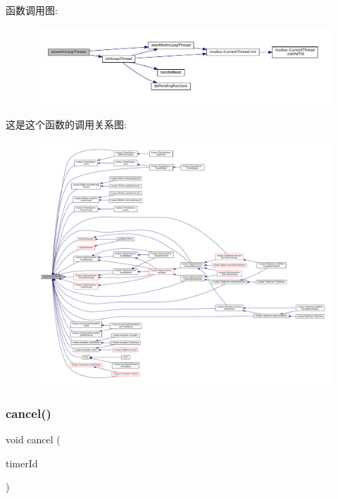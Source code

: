 函数调用图\+:
\nopagebreak
\begin{figure}[H]
\begin{center}
\leavevmode
\includegraphics[width=350pt]{classmuduo_1_1EventLoop_a9e9c23193ece3ba25a1a2779fc7ebc2d_cgraph}
\end{center}
\end{figure}
这是这个函数的调用关系图\+:
\nopagebreak
\begin{figure}[H]
\begin{center}
\leavevmode
\includegraphics[width=350pt]{classmuduo_1_1EventLoop_a9e9c23193ece3ba25a1a2779fc7ebc2d_icgraph}
\end{center}
\end{figure}
\mbox{\label{classmuduo_1_1EventLoop_af8b24b02bbff6a657fa5b0190bef9b9b}} 
\subsubsection{\texorpdfstring{cancel()}{cancel()}}
{\footnotesize\ttfamily void cancel (\begin{DoxyParamCaption}\item[{\hyperlink{classmuduo_1_1TimerId}{Timer\+Id}}]{timer\+Id }\end{DoxyParamCaption})}




